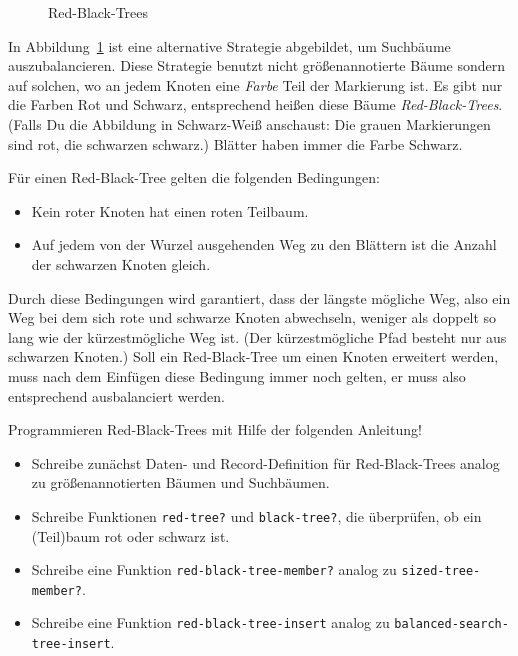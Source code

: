 \begin{aufgabe}
\begin{figure}[tb]
\begin{tikzpicture}[level/.style={sibling distance=13mm},
        triangle/.style = {regular polygon, regular polygon sides=3, draw},
        every node/.style={scale=0.8}]
\end{tikzpicture}    
    \caption{Red-Black-Trees}
    \label{fig:red-black-trees}
  \end{figure}

  In Abbildung~\ref{fig:red-black-trees} ist eine alternative
  Strategie abgebildet, um Suchbäume auszubalancieren. Diese Strategie
  benutzt nicht größenannotierte Bäume sondern auf solchen, wo an
  jedem Knoten eine \textit{Farbe} Teil der Markierung ist.  Es gibt
  nur die Farben Rot und Schwarz, entsprechend heißen diese Bäume
  \textit{Red-Black-Trees}.  (Falls Du die
  Abbildung in Schwarz-Weiß anschaust: Die grauen Markierungen sind
  rot, die schwarzen schwarz.)  Blätter haben immer die Farbe Schwarz.

  Für einen Red-Black-Tree gelten die folgenden Bedingungen:
  \begin{itemize}
  \item Kein roter Knoten hat einen roten Teilbaum.
  \item Auf jedem von der Wurzel ausgehenden Weg zu den Blättern ist
    die Anzahl der schwarzen Knoten gleich.
  \end{itemize}
  Durch diese Bedingungen wird garantiert, dass der längste mögliche
  Weg, also ein Weg bei dem sich rote und schwarze Knoten abwechseln,
  weniger als doppelt so lang wie der kürzestmögliche Weg ist. (Der
  kürzestmögliche Pfad besteht nur aus schwarzen Knoten.)  Soll ein
  Red-Black-Tree um einen Knoten erweitert werden, muss nach dem
  Einfügen diese Bedingung immer noch gelten, er muss also
  entsprechend ausbalanciert werden.
  
  Programmieren Red-Black-Trees mit Hilfe der folgenden Anleitung!

  \begin{itemize}
  \item Schreibe zunächst Daten- und Record-Definition für
    Red-Black-Trees analog zu größenannotierten Bäumen und Suchbäumen.
  \item Schreibe Funktionen \lstinline{red-tree?}  und
    \texttt{black-tree?}, die überprüfen, ob ein (Teil)baum rot oder
    schwarz ist.
  \item Schreibe eine Funktion \lstinline{red-black-tree-member?}
    analog zu \lstinline{sized-tree-member?}.
    
  \item Schreibe eine Funktion \lstinline{red-black-tree-insert}
    analog zu \lstinline{balanced-search-tree-insert}.
  \end{itemize}

\end{aufgabe}

